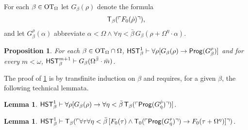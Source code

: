 \documentclass[UKenglish,cleveref,DIV=12]{scrartcl}
\newtheorem{lemma}[theorem]{Lemma}%
\newtheorem{proposition}[lemma]{Proposition}
\theoremstyle{definition}
\theoremstyle{definition}
\begin{document}
For each $\beta\in\mathrm{OT}_\Omega$ let $G_\beta(\rho)$ denote the formula
\begin{align*}
  \mathsf{T}_{\beta}(\ulcorner{F_0(\dot\rho)}\urcorner),
\end{align*}
and let $G_\beta^\rho(\alpha)$ abbreviate $\alpha<\Omega\land \forall\eta<\bar\beta\,G_\beta(\rho+\Omega^\eta\cdot\alpha)$.
\begin{proposition}\label{lem:Fbetawellordering1}
 For each $\beta\in\mathrm{OT}_\Omega\cap\Omega$, $\mathsf{HST}_{\beta}^1\vdash \forall\rho[G_\beta(\rho)\rightarrow \mathsf{Prog} (G_\beta^\rho)]$ and for every $m<\omega$, $\mathsf{HST}_{\beta}^{m+1}\vdash G_\beta(\Omega^{\bar\beta}\cdot\bar m)$.
\end{proposition}
The proof of \cref{lem:Fbetawellordering1} is by transfinite induction on
$\beta$ and requires, for a given $\beta$, the following technical lemmata.
\begin{lemma}\label{lem:Fbetatech1}
 $\mathsf{HST}_\beta^1\vdash \forall\rho[G_\beta(\rho)\rightarrow \forall\eta<\bar\beta\,\mathsf{T}_\beta(\ulcorner{\mathsf{Prog}(G_{\dot\eta}^{\dot\rho})}\urcorner)]$.
\end{lemma}
\begin{lemma}\label{lem:Fbetatech2}
  $\mathsf{HST}_\beta^1\vdash \mathsf{T}_\beta(\ulcorner{\forall\tau\forall\eta<\bar\beta\,[F_0(\tau)\land\mathsf{T}_0(\ulcorner{\mathsf{Prog}(G_{\dot\eta}^{\dot\tau})}\urcorner) \rightarrow
  F_0(\tau+\Omega^{\eta})]}\urcorner)$.
\end{lemma}
\end{document}
